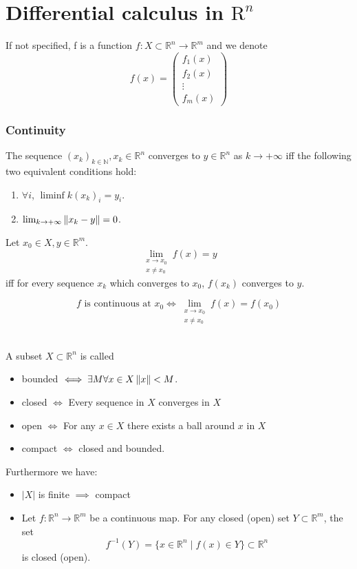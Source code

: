\part{Differential calculus in $\text{R}^n$}
\setcounter{section}{0}
If not specified, f is a function $f\colon X\subset \mathbb{R}^n\to\mathbb{R}^m$ and we denote
$$f(x) = \begin{pmatrix}f_1(x)\\f_2(x)\\\vdots\\f_m(x)\end{pmatrix}$$
\section{Continuity}

\Prop[Sequences] The sequence $(x_k)_{k\in\mathbb{N}}, x_k \in \mathbb{R}^n$ converges to $y\in \mathbb{R}^n$ as $k\rightarrow +\infty$ iff the following two equivalent conditions hold:
\begin{enumerate}
    \item $\forall i$, $\liminf{k}(x_{k})_i= y_i $.
    \item $\lim_{k\rightarrow +\infty}\left\lVert x_k-y \right\rVert=0$.
\end{enumerate}

\Prop[Limit] Let $x_0 \in X, y\in\mathbb{R}^m$.
$$ \lim_{\substack{x\rightarrow x_0 \\x \neq x_0}} f(x) = y $$
iff for every sequence $x_k$ which converges to $x_0$, $f(x_k)$ converges to $y$.

\Def[Continuity]
$$ f \text{ is continuous at } x_0 \iff \lim_{\substack{x\rightarrow x_0 \\x \neq x_0}} f(x) = f(x_0)$$

 \\
A subset $X\subset\mathbb{R}^n$ is called
\begin{itemize}
    \item bounded $\iff \exists M \forall x \in X \left\lVert x \right\rVert<M$.
    \item closed $\iff $ Every sequence in $X$ converges in $X$
   	\item open $\iff$ For any $x \in X$ there exists a ball around $x$ in $X$
   	\item compact $\iff$ closed and bounded.
\end{itemize}
Furthermore we have:
\begin{itemize}
    \item $|X|$ is finite $\implies$ compact
    \item Let $f\colon\mathbb{R}^n\to\mathbb{R}^m$ be a continuous map. For any closed (open) set $Y\subset\mathbb{R}^m$, the set
$$
    f^{-1}(Y) = \{x\in\mathbb{R}^n \mid f(x)\in Y\}\subset\mathbb{R}^n
$$
is closed (open).
\end{itemize}

